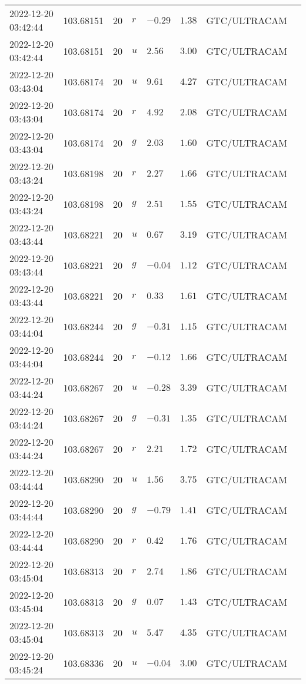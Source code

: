 \documentclass{nature_plusfigure}
\begin{document}
\begin{supplement}
\begin{center}
\begin{longtable}{llllllll}
2022-12-20 03:42:44 & 103.68151 & 20 & $r$ & $-0.29$ & $1.38$ & GTC/ULTRACAM &  \\ 
2022-12-20 03:42:44 & 103.68151 & 20 & $u$ & $2.56$ & $3.00$ & GTC/ULTRACAM &  \\ 
2022-12-20 03:43:04 & 103.68174 & 20 & $u$ & $9.61$ & $4.27$ & GTC/ULTRACAM &  \\ 
2022-12-20 03:43:04 & 103.68174 & 20 & $r$ & $4.92$ & $2.08$ & GTC/ULTRACAM &  \\ 
2022-12-20 03:43:04 & 103.68174 & 20 & $g$ & $2.03$ & $1.60$ & GTC/ULTRACAM &  \\ 
2022-12-20 03:43:24 & 103.68198 & 20 & $r$ & $2.27$ & $1.66$ & GTC/ULTRACAM &  \\ 
2022-12-20 03:43:24 & 103.68198 & 20 & $g$ & $2.51$ & $1.55$ & GTC/ULTRACAM &  \\ 
2022-12-20 03:43:44 & 103.68221 & 20 & $u$ & $0.67$ & $3.19$ & GTC/ULTRACAM &  \\ 
2022-12-20 03:43:44 & 103.68221 & 20 & $g$ & $-0.04$ & $1.12$ & GTC/ULTRACAM &  \\ 
2022-12-20 03:43:44 & 103.68221 & 20 & $r$ & $0.33$ & $1.61$ & GTC/ULTRACAM &  \\ 
2022-12-20 03:44:04 & 103.68244 & 20 & $g$ & $-0.31$ & $1.15$ & GTC/ULTRACAM &  \\ 
2022-12-20 03:44:04 & 103.68244 & 20 & $r$ & $-0.12$ & $1.66$ & GTC/ULTRACAM &  \\ 
2022-12-20 03:44:24 & 103.68267 & 20 & $u$ & $-0.28$ & $3.39$ & GTC/ULTRACAM &  \\ 
2022-12-20 03:44:24 & 103.68267 & 20 & $g$ & $-0.31$ & $1.35$ & GTC/ULTRACAM &  \\ 
2022-12-20 03:44:24 & 103.68267 & 20 & $r$ & $2.21$ & $1.72$ & GTC/ULTRACAM &  \\ 
2022-12-20 03:44:44 & 103.68290 & 20 & $u$ & $1.56$ & $3.75$ & GTC/ULTRACAM &  \\ 
2022-12-20 03:44:44 & 103.68290 & 20 & $g$ & $-0.79$ & $1.41$ & GTC/ULTRACAM &  \\ 
2022-12-20 03:44:44 & 103.68290 & 20 & $r$ & $0.42$ & $1.76$ & GTC/ULTRACAM &  \\ 
2022-12-20 03:45:04 & 103.68313 & 20 & $r$ & $2.74$ & $1.86$ & GTC/ULTRACAM &  \\ 
2022-12-20 03:45:04 & 103.68313 & 20 & $g$ & $0.07$ & $1.43$ & GTC/ULTRACAM &  \\ 
2022-12-20 03:45:04 & 103.68313 & 20 & $u$ & $5.47$ & $4.35$ & GTC/ULTRACAM &  \\ 
2022-12-20 03:45:24 & 103.68336 & 20 & $u$ & $-0.04$ & $3.00$ & GTC/ULTRACAM &  \\ 

\end{longtable}
\end{center}
\end{supplement}
\end{document}
